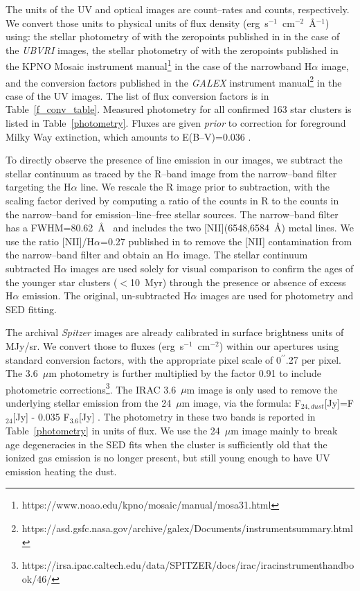 \documentclass{aastex63}
\begin{document}
The units of the UV and optical images are count--rates and counts, respectively. We convert those units to physical units of flux density (erg~s$^{-1}$~cm$^{-2}$~\r{A}$^{-1}$) using: the stellar photometry of \citet{Massey+2006} with the zeropoints published in \citet[p.~100]{Zombeck+1990} in the case of the \textit{UBVRI} images, the stellar photometry of \citet{Massey+2007} with the zeropoints published in the KPNO Mosaic instrument manual\footnote{https://www.noao.edu/kpno/mosaic/manual/mosa3\textunderscore 1.html} in the case of the narrowband H$\alpha$ image, and the conversion factors published in the \textit{GALEX} instrument manual\footnote{https://asd.gsfc.nasa.gov/archive/galex/Documents/instrument\textunderscore summary.html} in the case of the UV images. The list of flux conversion factors is in Table~\ref{f_conv_table}. Measured photometry for all confirmed 163 star clusters is listed in Table~\ref{photometry}. Fluxes are given {\em prior} to correction for foreground  Milky Way extinction, which amounts to E(B--V)=0.036 \citep{Schlafly+2011}. 

To directly observe the presence of line emission in our images, we subtract the stellar continuum as traced by the R--band image from the narrow--band filter targeting the H$\alpha$ line. We rescale the R image prior to subtraction, with the scaling factor derived by computing a ratio of the counts in R to the counts in the narrow--band for emission--line--free stellar sources. 
The narrow--band filter has a FWHM=80.62~\r{A}\ \citep{Massey+2007} and includes the two [NII](6548,6584~\r{A}) metal lines. We use the ratio [NII]/H$\alpha$=0.27 published in \citet{Kennicutt+2008} to remove the [NII] contamination from the narrow--band filter and obtain an H$\alpha$ image. 
The stellar continuum subtracted H$\alpha$ images are used solely for visual comparison to confirm the ages of the younger star clusters ($<$10~Myr) through the presence or absence of excess H$\alpha$ emission. The original, un-subtracted H$\alpha$ images are used for photometry and SED fitting.

The archival \textit{Spitzer} images are already calibrated in surface brightness units of MJy/sr. We convert those to fluxes (erg~s$^{-1}$~cm$^{-2}$) within our apertures using standard conversion factors, with the appropriate pixel scale of 0$^{\prime\prime}$.27 per pixel. The 3.6~$\mu$m photometry is further multiplied by the factor 0.91 to include photometric corrections\footnote{https://irsa.ipac.caltech.edu/data/SPITZER/docs/irac/iracinstrumenthandbook/46/}. The IRAC 3.6~$\mu$m image is only used to remove the underlying stellar emission from the 24~$\mu$m image, via the formula: F$_{24,dust}$[Jy]=F$_{24}$[Jy] - 0.035 F$_{3.6}$[Jy] \citep{Helou+2004, Calzetti+2007}. The photometry in these two bands is reported in Table~\ref{photometry} in units of flux. We use the 24~$\mu$m image mainly to break age degeneracies in the SED fits when the cluster is sufficiently old that the ionized gas emission is no longer present, but still young enough to have UV emission heating the dust. 
\end{document}
